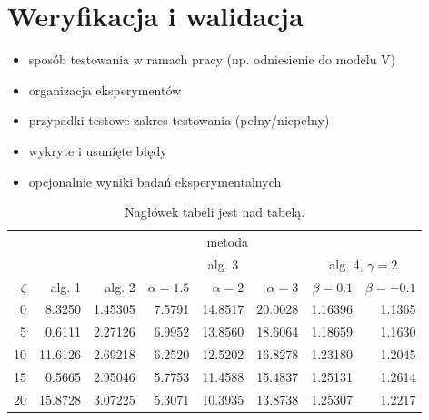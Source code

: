 \documentclass[a4paper,twoside,12pt]{book}
\begin{document}
\chapter{Weryfikacja i walidacja}
\label{ch:06}
\begin{itemize}
	\item sposób testowania w ramach pracy (np. odniesienie do modelu V)
	\item organizacja eksperymentów
	\item przypadki testowe zakres testowania (pełny/niepełny)
	\item wykryte i usunięte błędy
	\item opcjonalnie wyniki badań eksperymentalnych
\end{itemize}

\begin{table}
	\centering
	\caption{Nagłówek tabeli jest nad tabelą.}
	\label{id:tab:wyniki}
	\begin{tabular}{rrrrrrrr}
		\toprule
		        & \multicolumn{7}{c}{metoda}                                                                                                                                  \\
		\cmidrule{2-8}
		        &                            &         & \multicolumn{3}{c}{alg. 3} & \multicolumn{2}{c}{alg. 4, $\gamma = 2$}                                                \\
		\cmidrule(r){4-6}\cmidrule(r){7-8}
		$\zeta$ & alg. 1                     & alg. 2  & $\alpha= 1.5$              & $\alpha= 2$                              & $\alpha= 3$ & $\beta = 0.1$ & $\beta = -0.1$ \\
		\midrule
		0       & 8.3250                     & 1.45305 & 7.5791                     & 14.8517                                  & 20.0028     & 1.16396       & 1.1365         \\
		5       & 0.6111                     & 2.27126 & 6.9952                     & 13.8560                                  & 18.6064     & 1.18659       & 1.1630         \\
		10      & 11.6126                    & 2.69218 & 6.2520                     & 12.5202                                  & 16.8278     & 1.23180       & 1.2045         \\
		15      & 0.5665                     & 2.95046 & 5.7753                     & 11.4588                                  & 15.4837     & 1.25131       & 1.2614         \\
		20      & 15.8728                    & 3.07225 & 5.3071                     & 10.3935                                  & 13.8738     & 1.25307       & 1.2217         \\

\end{tabular}
\end{table}
\end{document}
